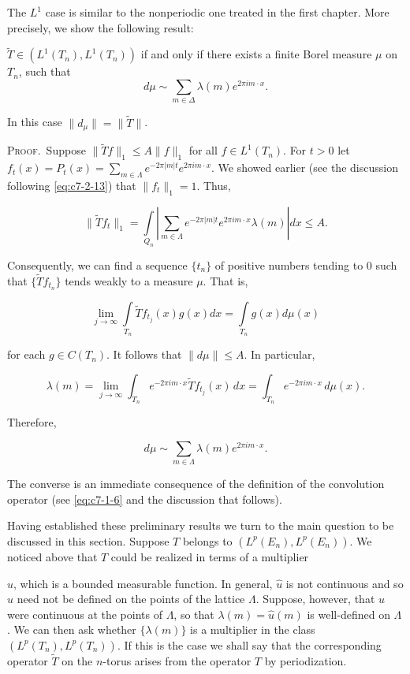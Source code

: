 The $L^{1}$ case is similar to the nonperiodic one treated in the first chapter. More precisely, we show the following result:

\begin{theorem}
\label{thm:c7-3-4}
$\tilde{T} \in (L^1(T_n), L^1(T_n))$ if and only if there exists a finite Borel measure $\mu$ on $T_n$, such that
\begin{equation}\label{eq:c7-3-5}
d\mu\sim\sum_{m\in\Delta}\lambda(m)e^{2\pi i m\cdot x}.
\end{equation}

\end{theorem}

In this case $\|d_\mu\| = \|\tilde{T}\|$.

\textsc{Proof.}\ Suppose $\|\tilde{T}f\|_1 \leq A \|f\|_1$ for all $f \in L^1(T_n)$. For $t > 0$ let $f_t(x) = P_t(x) = \sum_{m \in \Lambda} e^{-2\pi |m| t} e^{2\pi i m \cdot x}$. We showed earlier (see the discussion following \eqref{eq:c7-2-13}) that $\|f_t\|_1 = 1$. Thus,

\[
\|\tilde{T}f_{t}\|_{1}=\int\limits_{Q_{n}}\left|\sum_{m\in\Lambda}e^{-2\pi|m|t}e^{2\pi i m\cdot x}\lambda(m)\right|d x\leq A.
\]

Consequently, we can find a sequence $\{t_n\}$ of positive numbers tending to 0 such that $\{\tilde{T}f_{t_n}\}$ tends weakly to a measure $\mu$. That is,

\[
\lim_{j\to\infty}\int\limits_{T_{n}}\tilde{T}f_{t_{j}}(x)g(x)d x=\int\limits_{T_{n}}g(x)d\mu(x)
\]

for each $g \in C(T_n)$. It follows that $\|d\mu\| \leq A$. In particular,

\[
\lambda(m)=\lim_{j\to\infty}\int_{T_{n}}e^{-2\pi i m\cdot x}\widetilde{T}f_{t_{j}}(x)\,dx=\int_{T_{n}}e^{-2\pi i m\cdot x}\,d\mu(x).
\]

Therefore,

\[
d\mu\sim\sum_{m\in\Lambda}\lambda(m)e^{2\pi i m\cdot x}.
\]

The converse is an immediate consequence of the definition of the convolution operator (see \eqref{eq:c7-1-6} and the discussion that follows).

Having established these preliminary results we turn to the main question to be discussed in this section. Suppose $T$ belongs to $(L^p(E_n), L^p(E_n))$. We noticed above that $T$ could be realized in terms of a multiplier

$\hat{u}$, which is a bounded measurable function. In general, $\hat{u}$ is not continuous and so $\hat{u}$ need not be defined on the points of the lattice $\Lambda$. Suppose, however, that $\hat{u}$ were continuous at the points of $\Lambda$, so that $\lambda(m) = \hat{u}(m)$ is well-defined on $\Lambda$. We can then ask whether $\{\lambda(m)\}$ is a multiplier in the class $(L^p(T_n), L^p(T_n))$. If this is the case we shall say that the corresponding operator $\tilde{T}$ on the $n$-torus arises from the operator $T$ by periodization.

